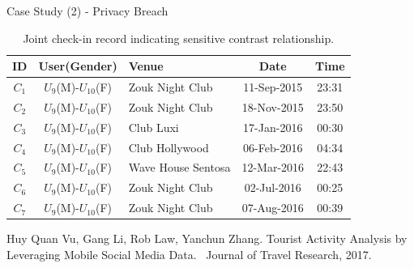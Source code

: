 \documentclass[
 size=14pt,
 paper=smartboard,  %
 mode=present, 		%
 display=slides, 	%
 pauseslide,
 fleqn,leqno]{powerdot}{}
\begin{document}




\begin{slide}[toc=,bm=]{Case Study (2) - Privacy Breach}

\begin{table}
	\setlength{\abovecaptionskip}{0pt}
	\setlength{\belowcaptionskip}{12pt}
	\centering
	\caption{Joint check-in record indicating sensitive contrast relationship\protect\footnotemark[1].}
	\begin{tabular}{c|c|l|c|c}	
	\toprule	
	ID  	&  	\textbf{User(Gender)}& 	\textbf{Venue} 		& 	\textbf{Date} 	&	\textbf{Time}	\\
	\midrule
	\rowcolor{orange}
	$C_1$	&	$U_9$(M)-$U_{10}$(F)	 &	Zouk Night Club		&	11-Sep-2015	    &	23:31\\
	\rowcolor{orange}
	$C_2$	&	$U_9$(M)-$U_{10}$(F)	 &	Zouk Night Club		&	18-Nov-2015	    &	23:50\\
	$C_3$	&	$U_9$(M)-$U_{10}$(F)	 &	Club Luxi			&	17-Jan-2016	    &	00:30\\
	$C_4$	&	$U_9$(M)-$U_{10}$(F)	 &	Club Hollywood		&	06-Feb-2016     &	04:34\\
	$C_5$	&	$U_9$(M)-$U_{10}$(F)	 &	Wave House Sentosa	&	12-Mar-2016	    &	22:43\\
	\rowcolor{orange}
	$C_6$	&	$U_9$(M)-$U_{10}$(F)	 &	Zouk Night Club		&	02-Jul-2016	    &	00:25\\
	\rowcolor{orange}
	$C_7$	&	$U_9$(M)-$U_{10}$(F)	 &	Zouk Night Club		&	07-Aug-2016	    &	00:39\\
	\bottomrule
	\end{tabular}
\end{table}

\begin{thebibliography}{}
\bibitem{}
\small{Huy Quan Vu, Gang Li, Rob Law, Yanchun Zhang.
Tourist Activity Analysis by Leveraging Mobile Social Media Data. 
Journal of Travel Research, 2017.}
\end{thebibliography}

\end{slide}
\end{document}
